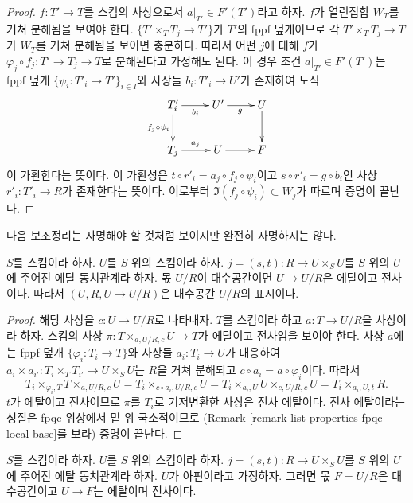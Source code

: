 \begin{proof}
\medskip\noindent
$f : T' \to T$를 스킴의 사상으로서 $a|_{T'} \in F'(T')$라고 하자.
$f$가 열린집합 $W_T$를 거쳐 분해됨을 보여야 한다.
$\{T' \times_T T_j \to T'\}$가 $T'$의 fppf 덮개이므로 각
$T' \times_T T_j \to T$가 $W_T$를 거쳐 분해됨을 보이면 충분하다.
따라서 어떤 $j$에 대해 $f$가
$\varphi_j \circ f_j : T' \to T_j \to T$로 분해된다고 가정해도 된다.
이 경우 조건 $a|_{T'} \in F'(T')$는 fppf 덮개
$\{\psi_i : T'_i \to T'\}_{i \in I}$와 사상들
$b_i : T'_i \to U'$가 존재하여 도식
$$
\xymatrix{
T'_i \ar[r]_{b_i} \ar[d]_{f_j \circ \psi_i} & U' \ar[r]_g & U \ar[d] \\
T_j \ar[r]^{a_j} & U \ar[r] & F
}
$$
이 가환한다는 뜻이다. 이 가환성은
$t \circ r'_i = a_j \circ f_j \circ \psi_i$이고
$s \circ r'_i = g \circ b_i$인 사상 $r'_i : T'_i \to R$가
존재한다는 뜻이다. 이로부터 $\Im(f_j \circ \psi_i) \subset W_j$가
따르며 증명이 끝난다.
\end{proof}

\noindent
다음 보조정리는 자명해야 할 것처럼 보이지만 완전히 자명하지는 않다.

\begin{lemma}
\label{lemma-when-it-works-it-works}
$S$를 스킴이라 하자. $U$를 $S$ 위의 스킴이라 하자.
$j = (s, t) : R \to U \times_S U$를 $S$ 위의 $U$에 주어진 에탈
동치관계라 하자. 몫 $U/R$이 대수공간이면
$U \to U/R$은 에탈이고 전사이다. 따라서
$(U, R, U \to U/R)$은 대수공간 $U/R$의 표시이다.
\end{lemma}

\begin{proof}
해당 사상을 $c : U \to U/R$로 나타내자.
$T$를 스킴이라 하고 $a : T \to U/R$을 사상이라 하자.
스킴의 사상 $\pi : T \times_{a, U/R, c} U \to T$가 에탈이고
전사임을 보여야 한다. 사상 $a$에는 fppf 덮개
$\{\varphi_i : T_i \to T\}$와 사상들 $a_i : T_i \to U$가 대응하여
$a_i \times a_{i'} : T_i \times_T T_{i'} \to U \times_S U$는
$R$을 거쳐 분해되고 $c \circ a_i = a \circ \varphi_i$이다. 따라서
$$
T_i \times_{\varphi_i, T} T \times_{a, U/R, c} U =
T_i \times_{c \circ a_i, U/R, c} U =
T_i \times_{a_i, U} U \times_{c, U/R, c} U = T_i \times_{a_i, U, t} R.
$$
$t$가 에탈이고 전사이므로 $\pi$를 $T_i$로 기저변환한 사상은 전사
에탈이다. 전사 에탈이라는 성질은 fpqc 위상에서 밑 위 국소적이므로
(Remark \ref{remark-list-properties-fpqc-local-base}를 보라) 증명이
끝난다.
\end{proof}

\begin{lemma}
\label{lemma-presentation-quasi-compact}
$S$를 스킴이라 하자.
$U$를 $S$ 위의 스킴이라 하자.
$j = (s, t) : R \to U \times_S U$를 $S$ 위의 $U$에 주어진 에탈
동치관계라 하자. $U$가 아핀이라고 가정하자. 그러면 몫
$F = U/R$은 대수공간이고 $U \to F$는 에탈이며 전사이다.
\end{lemma}


